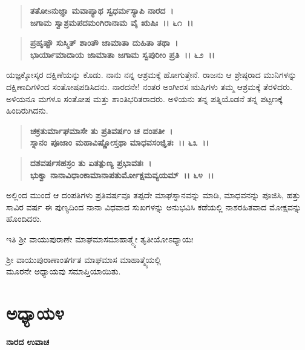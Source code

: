 \begin{verse}
\textbf{ತತೋsನುಜ್ಞಾ ಮವಾಪ್ಯಾಥ ಸ್ವಧರ್ಮಸ್ಯಾಪಿ ನಾರದ~।}\\\textbf{ಜಗಾಮ ಸ್ವಾಶ್ರಮಪದಮಂಗಿರಾನಾಮ ವೈ ಋಷಿಃ~।। ೬೧~।। }
\end{verse}

\begin{verse}
\textbf{ಪ್ರಹೃಷ್ಟೌ ಸುಸ್ಮಿತ್‌ ಶಾಂತೌ ಜಾಮಾತಾ ದುಹಿತಾ ತಥಾ~।}\\\textbf{ಭಾರ್ಯಾಮಾದಾಯ ಜಾಮಾತಾ ಜಗಾಮ ಸ್ವಪುರೀಂ ಪ್ರತಿ~।। ೬೨~।।}
\end{verse}

ಯಜ್ಞಕ್ಕೋಸ್ಕರ ದಕ್ಷಿಣೆಯನ್ನು ಕೊಡು. ನಾನು ನನ್ನ ಆಶ್ರಮಕ್ಕೆ ಹೋಗುತ್ತೇನೆ. ರಾಜನು ಆ ಶ್ರೇಷ್ಠರಾದ ಮುನಿಗಳನ್ನು ದಕ್ಷಿಣಾದಿಗಳಿಂದ ಸಂತೋಷಪಡಿಸಿದನು. ನಾರದನೇ! ನಂತರ ಅಂಗೀರಸ ಋಷಿಗಳು ತಮ್ಮ ಆಶ್ರಮಕ್ಕೆ ತೆರಳಿದರು. ಅಳಿಯನೂ ಮಗಳೂ ಸಂತೋಷ ಮತ್ತು ಶಾಂತಿಭರಿತರಾದರು. ಅಳಿಯನು ತನ್ನ ಪತ್ನಿಯೊಡನೆ ತನ್ನ ಪಟ್ಟಣಕ್ಕೆ ಹಿಂದಿರುಗಿದನು.

\begin{verse}
\textbf{ಚಕ್ರತುರ್ಮಾಘಮಾಸೇ ತು ಪ್ರತಿವರ್ಷಂ ಚ ದಂಪತೀ~।}\\\textbf{ಸ್ನಾನಂ ಪೂಜಾಂ ಮಹಾವಿಷ್ಣೋಸ್ತಥಾ ಮಾಧವಸಂಜ್ಞಿತಃ~।। ೬೩~।। }
\end{verse}

\begin{verse}
\textbf{ದಶವರ್ಷಸಹಸ್ರಂ ತು ಏತತ್ಪುಣ್ಯ ಪ್ರಭಾವತಃ~।}\\\textbf{ಭುಕ್ವಾ ನಾನಾವಿಧಾಂಕಾಮಾನಾಪತುರ್ಮೋಕ್ಷಮವ್ಯಯಮ್~।। ೬೪~।।}
\end{verse}

ಅಲ್ಲಿಂದ ಮುಂದೆ ಆ ದಂಪತಿಗಳು ಪ್ರತಿವರ್ಷವೂ ತಪ್ಪದೇ ಮಾಘಸ್ನಾನವನ್ನು ಮಾಡಿ, ಮಾಧವನನ್ನು ಪೂಜಿಸಿ, ಹತ್ತು ಸಾವಿರ ವರ್ಷ ಈ ಪುಣ್ಯದಿಂದ ನಾನಾ ವಿಧವಾದ ಸುಖಗಳನ್ನು ಅನುಭವಿಸಿ ಕಡೆಯಲ್ಲಿ ನಾಶರಹಿತವಾದ ಮೋಕ್ಷವನ್ನು ಹೊಂದಿದರು.

\begin{center}
ಇತಿ ಶ‍್ರೀ ವಾಯುಪುರಾಣೇ ಮಾಘಮಾಸಮಾಹಾತ್ಮ್ಯೇ ತೃತೀಯೋಽಧ್ಯಾಯಃ
\end{center}

\begin{center}
ಶ‍್ರೀ ವಾಯುಪುರಾಣಾಂತರ್ಗತ ಮಾಘಮಾಸ ಮಾಹಾತ್ಮ್ಯೆಯಲ್ಲಿ \\ ಮೂರನೇ ಅಧ್ಯಾಯವು ಸಮಾಪ್ತಿಯಾಯಿತು.
\end{center}

\newpage

\section*{ಅಧ್ಯಾಯ\enginline{-}೪}

\emptypage

\begin{flushleft}
\textbf{ನಾರದ ಉವಾಚ\enginline{-}}
\end{flushleft}

